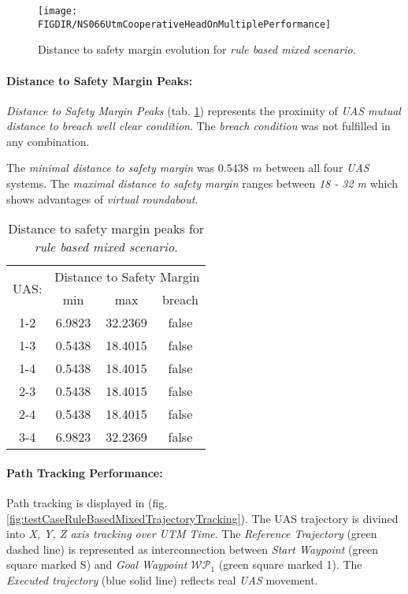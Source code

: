 \begin{figure}[H]
	\centering
	\texttt{[image: \\FIGDIR/NS066UtmCooperativeHeadOnMultiplePerformance]}
	\caption{Distance to safety margin evolution for \emph{rule based mixed scenario}.}
	\label{fig:testRuleBasedMultipleAvoidancePerformance}
\end{figure}

\paragraph{Distance to Safety Margin Peaks:} \emph{Distance to Safety Margin Peaks} (tab. \ref{tab:testCaseRuleBasedMixedSafetyMarginDistances}) represents the proximity of \emph{UAS mutual distance to breach well clear condition}. The \emph{breach condition} was not fulfilled in any combination. 

The \emph{minimal distance to safety margin} was $0.5438$ $m$ between all four \emph{UAS} systems. The \emph{maximal distance to safety margin} ranges between \emph{18 - 32 m} which shows advantages of \emph{virtual roundabout}.

\begin{table}[H]
	\centering
	\begin{tabular}{c||c|c|c}
		\multirow{2}{*}{UAS:} & \multicolumn{3}{c}{Distance to Safety Margin} \\ \cline{2-4} 
				  & min          & max         & breach         \\ \hline\hline
			1-2   & 6.9823       & 32.2369     & false          \\ \hline
			1-3   & 0.5438       & 18.4015     & false          \\ \hline
			1-4   & 0.5438       & 18.4015     & false          \\ \hline
			2-3   & 0.5438       & 18.4015     & false          \\ \hline
			2-4   & 0.5438       & 18.4015     & false          \\ \hline
			3-4   & 6.9823       & 32.2369     & false          \\ 
	\end{tabular}
	\caption{Distance to safety margin peaks for \emph{rule based mixed scenario}.}
	\label{tab:testCaseRuleBasedMixedSafetyMarginDistances}
\end{table}


\paragraph{Path Tracking Performance:} Path tracking is displayed in (fig. \ref{fig:testCaseRuleBasedMixedTrajectoryTracking}). The UAS trajectory is divined into \emph{X, Y, Z axis tracking over UTM Time}. The \emph{Reference Trajectory} (green dashed line) is represented as interconnection between \emph{Start Waypoint} (green square marked S) and  \emph{Goal Waypoint $\mathscr{WP}_1$} (green square marked 1). The \emph{Executed trajectory} (blue solid line) reflects real \emph{UAS} movement.

